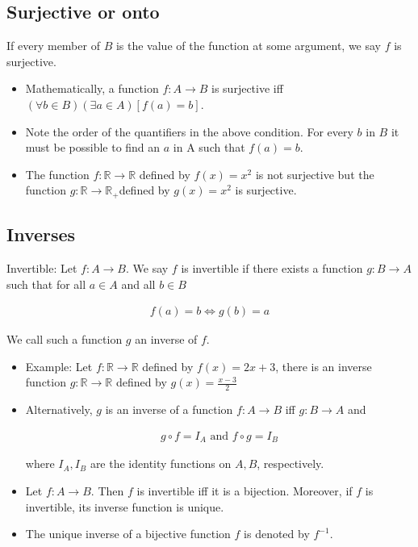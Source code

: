 \documentclass[12pt,a4paper,fleqn]{article}
\begin{document}
       
\subsection{Surjective or onto} 
 If every member of \(B\) is the value of the function at some argument, we say \(f\) is surjective.
 \begin{itemize}
   \item Mathematically, a function \(f: A \rightarrow B\) is surjective iff \((\forall b \in B)(\exists a \in A)[f(a)=b]\).
   \item Note the order of the quantifiers in the above condition. For every \(b\) in \(B\) it must be possible to find an \(a\) in A such that \(f(a)=b\).
   \item The function \(f: \mathbb{R} \rightarrow \mathbb{R}\) defined by \(f(x)=x^2\) is not surjective but the function \(g: \mathbb{R} \rightarrow \mathbb{R}_{+}\)defined by \(g(x)=x^2\) is surjective.
 \end{itemize}
  \subsection{Inverses}
  Invertible: Let \(f: A \rightarrow B\). We say \(f\) is invertible if there exists a function \(g: B \rightarrow A\) such that for all \(a \in A\) and all \(b \in B\)

  \begin{align*}
  f(a)=b \Longleftrightarrow g(b)=a
  \end{align*}
  
  
  We call such a function \(g\) an inverse of \(f\). 
  \begin{itemize}
    \item Example: Let \(f: \mathbb{R} \rightarrow \mathbb{R}\) defined by \(f(x)=2 x+3\), there is an inverse function \(g: \mathbb{R} \rightarrow \mathbb{R}\) defined by \(g(x)=\frac{x-3}{2}\)
    \item Alternatively, \(g\) is an inverse of a function \(f: A \rightarrow B\) iff \(g: B \rightarrow A\) and
    
    \begin{align*}
    g \circ f=I_A \text { and } f \circ g=I_B
    \end{align*}
    
    where \(I_A, I_B\) are the identity functions on \(A, B\), respectively.
    \item Let \(f: A \rightarrow B\). Then \(f\) is invertible iff it is a bijection. Moreover, if \(f\) is invertible, its inverse function is unique.
    \item The unique inverse of a bijective function \(f\) is denoted by \(f^{-1}\).
  \end{itemize}
  
\end{document}
